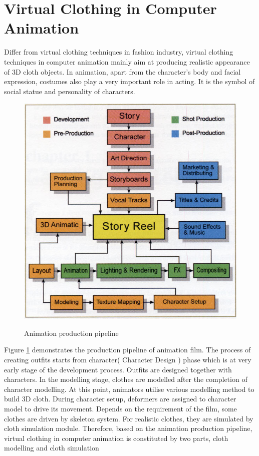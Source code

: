 \section{Virtual Clothing in Computer Animation}

Differ from virtual clothing techniques in fashion industry, virtual clothing techniques in computer animation mainly aim at producing realistic appearance of 3D cloth objects. In animation, apart from the character's body and facial expression, costumes also play a very important role in acting. It is the symbol of social statue and personality of characters. 

 \begin{figure}[H]
    \centering
	\includegraphics[width=0.9\columnwidth]{../images/animation_pipeline}\\[1cm]
    \caption{Animation production pipeline}
    \label{Figure:pipeline}
\end{figure} 

Figure \ref{Figure:pipeline} demonstrates the production pipeline of animation film. The process of creating outfits starts from character( Character Design ) phase which is at very early stage of the development process. Outfits are designed together with characters. In the modelling stage, clothes are modelled after the completion of character modelling. At this point, animators utilise various modelling method to build 3D cloth. During character setup, deformers are assigned to character model to drive its movement. Depends on the requirement of the film, some clothes are driven by skeleton system. For realistic clothes, they are simulated by cloth simulation module. Therefore, based on the animation production pipeline, virtual clothing in computer animation is constituted by two parts, cloth modelling and cloth simulation


